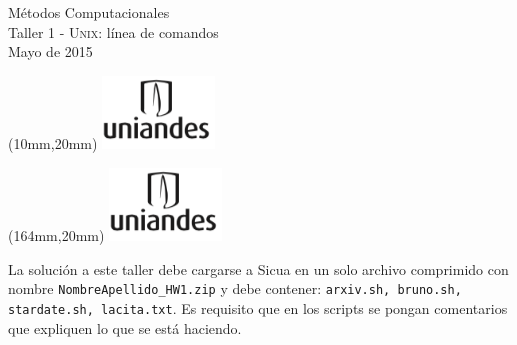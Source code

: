 \documentclass[11pt,letterpaper]{exam}
\begin{document}
\begin{center}
{\Large Métodos Computacionales} \\
Taller 1 - \textsc{Unix}: línea de comandos \\
Mayo de 2015
\end{center}

\begin{textblock*}{40mm}(10mm,20mm)
  \includegraphics[width=3cm]{logoUniandes.png}
\end{textblock*}

\begin{textblock*}{40mm}(164mm,20mm)
  \includegraphics[width=3cm]{logoUniandes.png}
\end{textblock*}

\vspace{0.5cm}

La solución a este taller debe cargarse a Sicua en un solo archivo comprimido con nombre \verb+NombreApellido_HW1.zip+ y debe contener: \verb+arxiv.sh, bruno.sh, stardate.sh, lacita.txt+. Es requisito que en los scripts se pongan comentarios que expliquen lo que se está haciendo.

\vspace{0.5cm}
\end{document}

